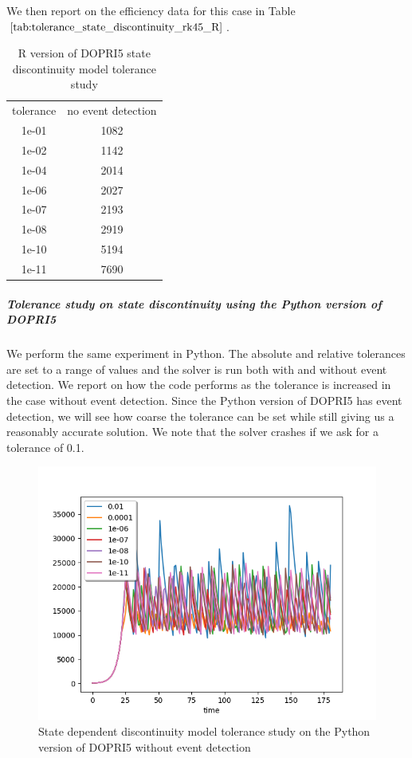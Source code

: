 We then report on the efficiency data for this case in Table $\ref{tab:tolerance_state_discontinuity_rk45_R}$. 

\begin{table}[h]
\caption {R version of DOPRI5 state discontinuity model tolerance study} \label{tab:tolerance_state_discontinuity_rk45_R} 
\begin{center}
\begin{tabular}{ c c }
tolerance & no event detection \\
1e-01 & 1082 \\
1e-02 & 1142 \\
1e-04 & 2014 \\
1e-06 & 2027 \\
1e-07 & 2193 \\
1e-08 & 2919 \\
1e-10 & 5194 \\
1e-11 & 7690 \\
\end{tabular}
\end{center}
\end{table}

\subparagraph{Tolerance study on state discontinuity using the Python version of DOPRI5}
We perform the same experiment in Python. The absolute and relative tolerances are set to a range of values and the solver is run both with and without event detection. We report on how the code performs as the tolerance is increased in the case without event detection. Since the Python version of DOPRI5 has event detection, we will see how coarse the tolerance can be set while still giving us a reasonably accurate solution. We note that the solver crashes if we ask for a tolerance of 0.1.

\begin{figure}[h]
\centering
\includegraphics[width=0.7\linewidth]{./figures/tolerance_state_rk45_no_event_py}
\caption{State dependent discontinuity model tolerance study on the Python version of DOPRI5 without event detection}
\label{fig:tolerance_state_rk45_no_event_py}
\end{figure}

